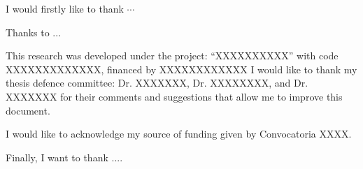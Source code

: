 \begin{acknowledgements}      


I would firstly like to thank $\cdots$
\newline

Thanks to ...
\newline

This research was developed under the project: ``XXXXXXXXXX'' with code XXXXXXXXXXXXX, financed by XXXXXXXXXXXX
I would like to thank my thesis defence committee: Dr. XXXXXXX, Dr. XXXXXXXX, and Dr. XXXXXXX for their comments and suggestions that allow me to improve this document.

I would like to acknowledge my source of funding given by Convocatoria XXXX.
\newline

Finally, I want to thank ....


\end{acknowledgements}